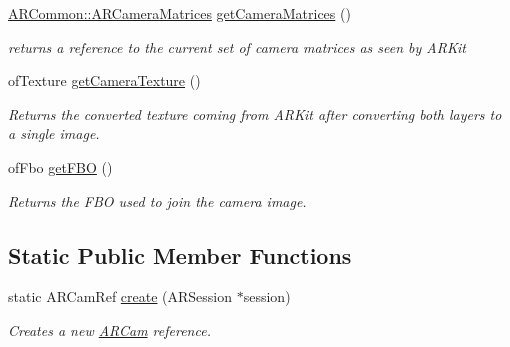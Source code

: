 \begin{DoxyCompactItemize}
\mbox{\label{class_a_r_core_1_1_a_r_cam_a1398ffe9720425cfbc99635b08bc80d6}} 
\hyperlink{struct_a_r_common_1_1_a_r_camera_matrices}{A\+R\+Common\+::\+A\+R\+Camera\+Matrices} \hyperlink{class_a_r_core_1_1_a_r_cam_a1398ffe9720425cfbc99635b08bc80d6}{get\+Camera\+Matrices} ()
\begin{DoxyCompactList}\small\item\em returns a reference to the current set of camera matrices as seen by A\+R\+Kit \end{DoxyCompactList}\item 
\mbox{\label{class_a_r_core_1_1_a_r_cam_ae816096383bfc8fbcf6b67ab82b3d629}} 
of\+Texture \hyperlink{class_a_r_core_1_1_a_r_cam_ae816096383bfc8fbcf6b67ab82b3d629}{get\+Camera\+Texture} ()
\begin{DoxyCompactList}\small\item\em Returns the converted texture coming from A\+R\+Kit after converting both layers to a single image. \end{DoxyCompactList}\item 
\mbox{\label{class_a_r_core_1_1_a_r_cam_a4c8f3c9b55f5852dc7a8554fe6ac0888}} 
of\+Fbo \hyperlink{class_a_r_core_1_1_a_r_cam_a4c8f3c9b55f5852dc7a8554fe6ac0888}{get\+F\+BO} ()
\begin{DoxyCompactList}\small\item\em Returns the F\+BO used to join the camera image. \end{DoxyCompactList}\end{DoxyCompactItemize}
\subsection*{Static Public Member Functions}
\begin{DoxyCompactItemize}
\item 
\mbox{\label{class_a_r_core_1_1_a_r_cam_ad4a6c0ebf786ea4e745cc8e95790681a}} 
static A\+R\+Cam\+Ref \hyperlink{class_a_r_core_1_1_a_r_cam_ad4a6c0ebf786ea4e745cc8e95790681a}{create} (A\+R\+Session $\ast$session)
\begin{DoxyCompactList}\small\item\em Creates a new \hyperlink{class_a_r_core_1_1_a_r_cam}{A\+R\+Cam} reference. \end{DoxyCompactList}\end{DoxyCompactItemize}
